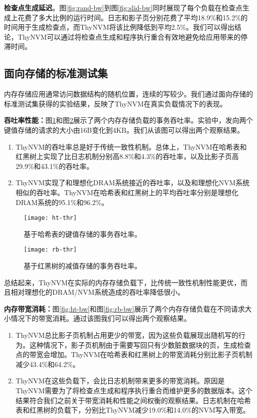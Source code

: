 \textbf{检查点生成延迟}。图\ref{fig:rand-bw}到图\ref{fig:slid-bw}同时展现了每个负载在检查点生成上花费了多大比例的运行时间。日志和影子页分别花费了平均18.9\%和15.2\%的时间用于生成检查点，而ThyNVM将该比例降低到平均2.5\%。我们可以得出结论，ThyNVM可以通过将检查点生成和程序执行重合有效地避免给应用带来的停滞时间。

\subsection{面向存储的标准测试集}

内存存储应用通常访问数据结构的随机位置，连续的写较少。我们通过面向存储的标准测试集获得的实验结果，反映了ThyNVM在真实负载情况下的表现。

\textbf{吞吐率性能：}图\ref{fig:ht-thr}和图\ref{fig:rb-thr}展示了两个内存存储负载的事务吞吐率。实验中，发向两个键值存储的请求的大小由16B变化到4KB。我们从该图可以得出两个观察结果。
\begin{enumerate}
\item ThyNVM的吞吐率总是好于传统一致性机制。总体上，ThyNVM在哈希表和红黑树上实现了比日志机制分别高8.8\%和4.3\%的吞吐率，以及比影子页高29.9\%和43.1\%的吞吐率。
\item ThyNVM实现了和理想化DRAM系统接近的吞吐率，以及和理想化NVM系统相似的吞吐率。ThyNVM在哈希表和红黑树上的平均吞吐率分别是理想化DRAM系统的95.1\%和96.2\%。
\end{enumerate}

\begin{figure}[!h]
  \centering
  \texttt{[image: ht-thr]}\\
  \caption{基于哈希表的键值存储的事务吞吐率。}
  \label{fig:ht-thr}
\end{figure}

\begin{figure}[!h]
  \centering
  \texttt{[image: rb-thr]}\\
  \caption{基于红黑树的减值存储的事务吞吐率。}
  \label{fig:rb-thr}
\end{figure}

总结起来，ThyNVM在实际的内存存储负载下，比传统一致性机制性能更优，而且相对理想化的DRAM/NVM系统造成的吞吐率降低很小。 

\textbf{内存带宽消耗：}图\ref{fig:ht-bw}和图\ref{fig:rb-bw}展示了两个内存存储负载在不同请求大小情况下的带宽消耗。通过该图我们可以得出两个观察结果。
\begin{enumerate}
\item ThyNVM总比影子页机制占用更少的带宽，因为这些负载展现出随机写的行为。这种情况下，影子页机制由于需要写回只有少数脏数据块的页，生成检查点的带宽会增加。ThyNVM在哈希表和红黑树上的带宽消耗分别比影子页机制减少43.4\%和64.2\%。
\item ThyNVM在这些负载下，会比日志机制带来更多的带宽消耗。原因是ThyNVM需要为了将检查点生成和程序执行重合而维护更多的数据版本。这个结果符合我们之前关于带宽消耗和性能之间权衡的观察结果。日志机制在哈希表和红黑树的负载下，分别比ThyNVM减少19.0\%和14.0\%的NVM写入带宽。
\end{enumerate}


